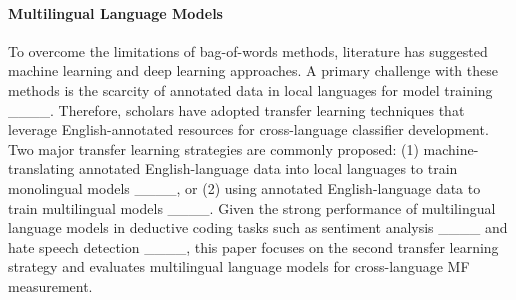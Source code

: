 


\paragraph{Multilingual Language Models}
To overcome the limitations of bag-of-words methods, literature has suggested machine learning and deep learning approaches. A primary challenge with these methods is the scarcity of annotated data in local languages for model training ____. Therefore, scholars have adopted transfer learning techniques that leverage English-annotated resources for cross-language classifier development. Two major transfer learning strategies are commonly proposed: (1) machine-translating annotated English-language data into local languages to train monolingual models ____, or (2) using annotated English-language data to train multilingual models ____. Given the strong performance of multilingual language models in deductive coding tasks such as sentiment analysis ____ and hate speech detection ____, this paper focuses on the second transfer learning strategy and evaluates multilingual language models for cross-language MF measurement. 




